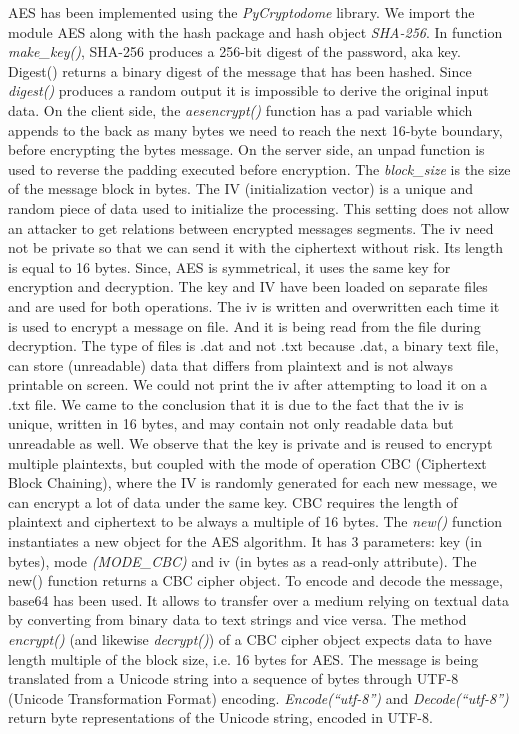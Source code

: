 AES has been implemented using the \textit{PyCryptodome} library. We import the module AES along with the hash package and hash object \textit{SHA-256}. In function \textit{make\_key()}, SHA-256 produces a 256-bit digest of the password, aka key. Digest() returns a binary digest of the message that has been hashed. Since \textit{digest()} produces a random output it is impossible to derive the original input data. On the client side, the \textit{aesencrypt()} function has a pad variable which appends to the back as many bytes we need to reach the next 16-byte boundary, before encrypting the bytes message. On the server side, an unpad function is used to reverse the padding executed before encryption. The \textit{block\_size} is the size of the message block in bytes. The IV (initialization vector) is a unique and random piece of data used to initialize the processing. This setting does not allow an attacker to get relations between encrypted messages segments. The iv need not be private so that we can send it with the ciphertext without risk. Its length is equal to 16 bytes. Since, AES is symmetrical, it uses the same key for encryption and decryption. The key and IV have been loaded on separate files and are used for both operations. The iv is written and overwritten each time it is used to encrypt a message on file. And it is being read from the file during decryption. The type of files is .dat and not .txt because .dat, a binary text file, can store (unreadable) data that differs from plaintext and is not always printable on screen. We could not print the iv after attempting to load it on a .txt file. We came to the conclusion that it is due to the fact that the iv is unique, written in 16 bytes, and may contain not only readable data but unreadable as well. We observe that the key is private and is reused to encrypt multiple plaintexts, but coupled with the mode of operation CBC (Ciphertext Block Chaining), where the IV is randomly generated for each new message, we can encrypt a lot of data under the same key. CBC requires the length of plaintext and ciphertext to be always a multiple of 16 bytes. The \textit{new()} function instantiates a new object for the AES algorithm. It has 3 parameters: key (in bytes), mode \textit{(MODE\_CBC)} and iv (in bytes as a read-only attribute). The new() function returns a CBC cipher object. To encode and decode the message, base64 has been used. It allows to transfer over a medium relying on textual data by converting from binary data to text strings and vice versa. The method \textit{encrypt()} (and likewise \textit{decrypt()}) of a CBC cipher object expects data to have length multiple of the block size, i.e. 16 bytes for AES. The message is being translated from a Unicode string into a sequence of bytes through UTF-8 (Unicode Transformation Format) encoding. \textit{Encode(“utf-8”)} and \textit{Decode(“utf-8”)} return byte representations of the Unicode string, encoded in UTF-8.

